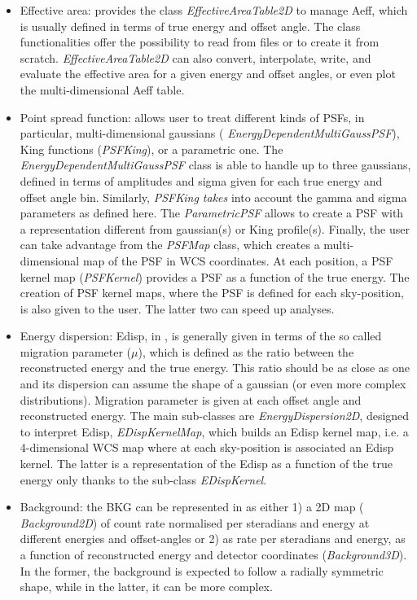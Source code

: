 \begin{itemize}
	\item Effective area: \gammapy provides the class {\it EffectiveAreaTable2D} to
	      manage Aeff, which is usually defined in terms of true energy and offset angle.
	      The class functionalities offer the possibility to read from files or to create
	      it from scratch. {\it EffectiveAreaTable2D} can also convert, interpolate,
	      write, and evaluate the effective area for a given energy and offset angles, or
	      even plot the multi-dimensional Aeff table.

	\item Point spread function: \gammapy allows user to treat different kinds of PSFs,
	      in particular, multi-dimensional gaussians ({\it
			      EnergyDependentMultiGaussPSF}), King functions ({\it PSFKing}), or a parametric
	      one. The {\it EnergyDependentMultiGaussPSF} class is able to handle up to three
	      gaussians, defined in terms of amplitudes and sigma given for each true energy
	      and offset angle bin. Similarly, {\it PSFKing takes} into account the gamma and
	      sigma parameters as defined here. The {\it ParametricPSF} allows to create a
	      PSF with a representation different from gaussian(s) or King profile(s).
	      Finally, the user can take advantage from the {\it PSFMap} class, which creates
	      a multi-dimensional map of the PSF in WCS coordinates. At each position, a PSF
	      kernel map ({\it PSFKernel}) provides a PSF as a function of the true energy.
	      The creation of PSF kernel maps, where the PSF is defined for each
	      sky-position, is also given to the user. The latter two can speed up analyses.

	\item Energy dispersion: Edisp, in \iact, is generally given in terms of the so
	      called migration parameter ($\mu$), which is defined as the ratio between the
	      reconstructed energy and the true energy. This ratio should be as close as one
	      and its dispersion can assume the shape of a gaussian (or even more complex
	      distributions). Migration parameter is given at each offset angle and
	      reconstructed energy. The main sub-classes are {\it EnergyDispersion2D},
	      designed to interpret Edisp, {\it EDispKernelMap}, which builds an Edisp kernel
	      map, i.e. a 4-dimensional WCS map where at each sky-position is associated an
	      Edisp kernel. The latter is a representation of the Edisp as a function of the
	      true energy only thanks to the sub-class {\it EDispKernel}.

	\item Background: the BKG can be represented in \gammapy as either 1) a 2D map ({\it
			      Background2D}) of count rate normalised per steradians and energy at different
	      energies and offset-angles or 2) as rate per steradians and energy, as a
	      function of reconstructed energy and detector coordinates ({\it Background3D}).
	      In the former, the background is expected to follow a radially symmetric shape,
	      while in the latter, it can be more complex.

\end{itemize}

